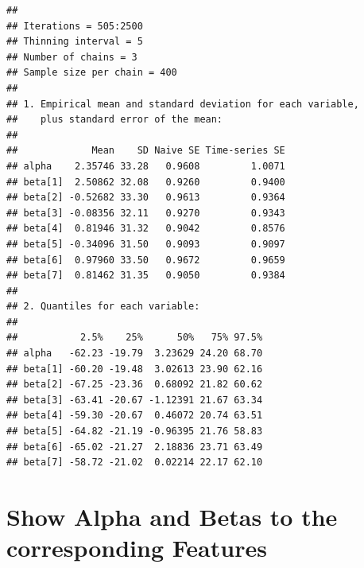 \documentclass[
]{article}
\newenvironment{Shaded}{\begin{snugshade}}{\end{snugshade}}
\newcommand{\DecValTok}[1]{\textcolor[rgb]{0.00,0.00,0.81}{#1}}
\newcommand{\FunctionTok}[1]{\textcolor[rgb]{0.13,0.29,0.53}{\textbf{#1}}}
\newcommand{\NormalTok}[1]{#1}
\newcommand{\OtherTok}[1]{\textcolor[rgb]{0.56,0.35,0.01}{#1}}
\newcommand{\SpecialCharTok}[1]{\textcolor[rgb]{0.81,0.36,0.00}{\textbf{#1}}}
\begin{document}
\begin{verbatim}
## 
## Iterations = 505:2500
## Thinning interval = 5 
## Number of chains = 3 
## Sample size per chain = 400 
## 
## 1. Empirical mean and standard deviation for each variable,
##    plus standard error of the mean:
## 
##             Mean    SD Naive SE Time-series SE
## alpha    2.35746 33.28   0.9608         1.0071
## beta[1]  2.50862 32.08   0.9260         0.9400
## beta[2] -0.52682 33.30   0.9613         0.9364
## beta[3] -0.08356 32.11   0.9270         0.9343
## beta[4]  0.81946 31.32   0.9042         0.8576
## beta[5] -0.34096 31.50   0.9093         0.9097
## beta[6]  0.97960 33.50   0.9672         0.9659
## beta[7]  0.81462 31.35   0.9050         0.9384
## 
## 2. Quantiles for each variable:
## 
##           2.5%    25%      50%   75% 97.5%
## alpha   -62.23 -19.79  3.23629 24.20 68.70
## beta[1] -60.20 -19.48  3.02613 23.90 62.16
## beta[2] -67.25 -23.36  0.68092 21.82 60.62
## beta[3] -63.41 -20.67 -1.12391 21.67 63.34
## beta[4] -59.30 -20.67  0.46072 20.74 63.51
## beta[5] -64.82 -21.19 -0.96395 21.76 58.83
## beta[6] -65.02 -21.27  2.18836 23.71 63.49
## beta[7] -58.72 -21.02  0.02214 22.17 62.10
\end{verbatim}

\section{Show Alpha and Betas to the corresponding
Features}\label{show-alpha-and-betas-to-the-corresponding-features-1}

\begin{Shaded}
\end{Shaded}
\end{document}
